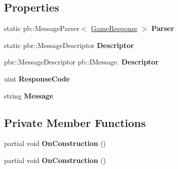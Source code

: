 \subsection*{Properties}
\begin{DoxyCompactItemize}
\item 
\mbox{\label{class_coinche_1_1_google_1_1_protobuf_1_1_game_response_ae697d83781892940db0424feb116c2a8}} 
static pb\+::\+Message\+Parser$<$ \hyperlink{class_coinche_1_1_google_1_1_protobuf_1_1_game_response}{Game\+Response} $>$ {\bfseries Parser}
\item 
\mbox{\label{class_coinche_1_1_google_1_1_protobuf_1_1_game_response_a3535acbcf855250dd161ec18f25ca438}} 
static pbr\+::\+Message\+Descriptor {\bfseries Descriptor}
\item 
\mbox{\label{class_coinche_1_1_google_1_1_protobuf_1_1_game_response_a22e66378367208eeb12cc1ccae374be9}} 
pbr\+::\+Message\+Descriptor pb\+::\+I\+Message. {\bfseries Descriptor}
\item 
\mbox{\label{class_coinche_1_1_google_1_1_protobuf_1_1_game_response_ac77f257ab0429c476593c7f162fa27ce}} 
uint {\bfseries Response\+Code}
\item 
\mbox{\label{class_coinche_1_1_google_1_1_protobuf_1_1_game_response_a3d6f6b5efe3151d6f17218137a367ca8}} 
string {\bfseries Message}
\end{DoxyCompactItemize}
\subsection*{Private Member Functions}
\begin{DoxyCompactItemize}
\item 
\mbox{\label{class_coinche_1_1_google_1_1_protobuf_1_1_game_response_aae25372e8154685229e27f4351532763}} 
partial void {\bfseries On\+Construction} ()
\item 
\mbox{\label{class_coinche_1_1_google_1_1_protobuf_1_1_game_response_aae25372e8154685229e27f4351532763}} 
partial void {\bfseries On\+Construction} ()
\end{DoxyCompactItemize}

